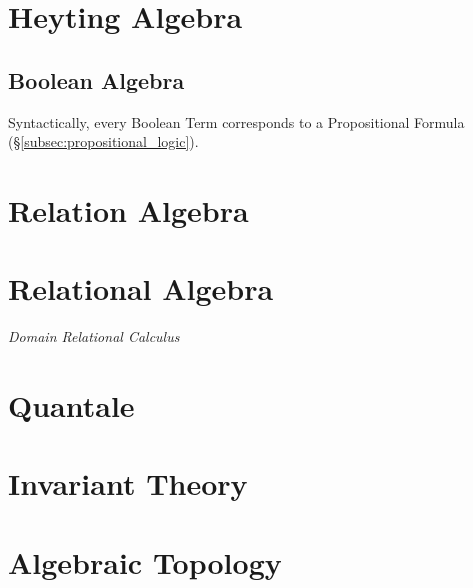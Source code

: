 \section{Heyting Algebra}\label{subsec:heyting_algebra}

\subsection{Boolean Algebra}\label{subsec:boolean_algebra}

Syntactically, every Boolean Term corresponds to a Propositional
Formula (\S\ref{subsec:propositional_logic}).



\section{Relation Algebra}

\section{Relational Algebra}

\emph{Domain Relational Calculus}



\section{Quantale}

\section{Invariant Theory}\label{subsec:invariant_theory}

\section{Algebraic Topology}\label{subsec:algebraic_topology}
